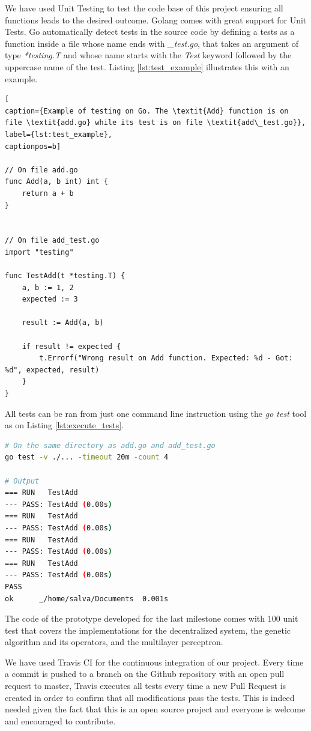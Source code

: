 We have used Unit Testing to test the code base of this project ensuring all functions leads to the desired outcome. Golang comes with great support for Unit Tests. Go automatically detect tests in the source code by defining a tests as a function inside a file whose name ends with \textit{\_test.go}, that takes an argument of type \textit{*testing.T} and whose name starts with the \textit{Test} keyword followed by the uppercase name of the test. Listing \ref{lst:test_example} illustrates this with an example.

\begin{lstlisting}[
caption={Example of testing on Go. The \textit{Add} function is on file \textit{add.go} while its test is on file \textit{add\_test.go}},
label={lst:test_example},
captionpos=b]

// On file add.go 
func Add(a, b int) int {
	return a + b
}


// On file add_test.go
import "testing"

func TestAdd(t *testing.T) {
	a, b := 1, 2
	expected := 3
	
	result := Add(a, b)
	
	if result != expected {
		t.Errorf("Wrong result on Add function. Expected: %d - Got: %d", expected, result)	
	}
}
\end{lstlisting}

All tests can be ran from just one command line instruction using the \textit{go test} tool as on Listing \ref{lst:execute_tests}.

\begin{lstlisting}[language=bash,
caption={Run all tests on this directory and its sub-directories (\textit{./...}) 4 times, with a timeout of 20 minutes.},
label={lst:execute_tests},
captionpos=b]
# On the same directory as add.go and add_test.go
go test -v ./... -timeout 20m -count 4

# Output
=== RUN   TestAdd
--- PASS: TestAdd (0.00s)
=== RUN   TestAdd
--- PASS: TestAdd (0.00s)
=== RUN   TestAdd
--- PASS: TestAdd (0.00s)
=== RUN   TestAdd
--- PASS: TestAdd (0.00s)
PASS
ok  	_/home/salva/Documents	0.001s
\end{lstlisting}

The code of the prototype developed for the last milestone comes with 100 unit test that covers the implementations for the decentralized system, the genetic algorithm and its operators, and the multilayer perceptron.

We have used Travis CI for the continuous integration of our project. Every time a commit is pushed to a branch on the Github repository with an open pull request to master, Travis executes all tests every time a new Pull Request is created in order to confirm that all modifications pass the tests. This is indeed needed given the fact that this is an open source project and everyone is welcome and encouraged to contribute.

